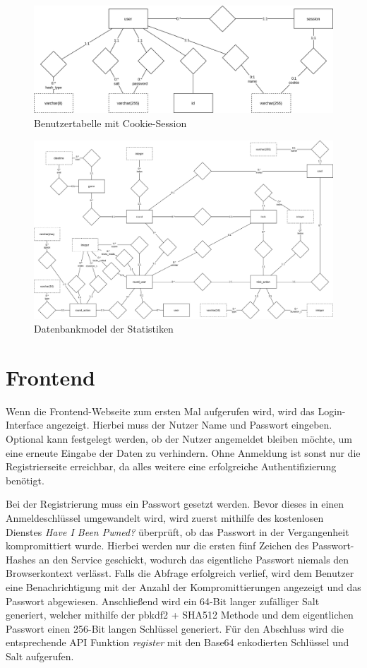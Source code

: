 \begin{figure}[h]
	\includegraphics[width=\textwidth]{images/user-db.png}
	\caption{Benutzertabelle mit Cookie-Session}
	\label{fig:user-db}
\end{figure}

\begin{figure}
	\includegraphics[width=\textheight]{images/statistics-db.png}
	\caption{Datenbankmodel der Statistiken}
	\label{fig:statistics-db}
\end{figure}

\section{Frontend}
Wenn die Frontend-Webseite zum ersten Mal aufgerufen wird, wird das Login-Interface angezeigt. Hierbei muss der Nutzer Name und Passwort eingeben. Optional kann festgelegt werden, ob der Nutzer angemeldet bleiben möchte, um eine erneute Eingabe der Daten zu verhindern. Ohne Anmeldung ist sonst nur die Registrierseite erreichbar, da alles weitere eine erfolgreiche Authentifizierung benötigt.

\label{sec:frontend-registrierung}
Bei der Registrierung muss ein Passwort gesetzt werden. Bevor dieses in einen Anmeldeschlüssel umgewandelt wird, wird zuerst mithilfe des kostenlosen Dienstes \textit{Have I Been Pwned?} überprüft, ob das Passwort in der Vergangenheit kompromittiert wurde. Hierbei werden nur die ersten fünf Zeichen des Passwort-Hashes an den Service geschickt, wodurch das eigentliche Passwort niemals den Browserkontext verlässt. Falls die Abfrage erfolgreich verlief, wird dem Benutzer eine Benachrichtigung mit der Anzahl der Kompromittierungen angezeigt und das Passwort abgewiesen. Anschließend wird ein 64-Bit langer zufälliger Salt generiert, welcher mithilfe der \gls{pbkdf2} + SHA512 Methode und dem eigentlichen Passwort einen 256-Bit langen Schlüssel generiert. Für den Abschluss wird die entsprechende API Funktion \textit{register} mit den Base64 enkodierten Schlüssel und Salt aufgerufen.

